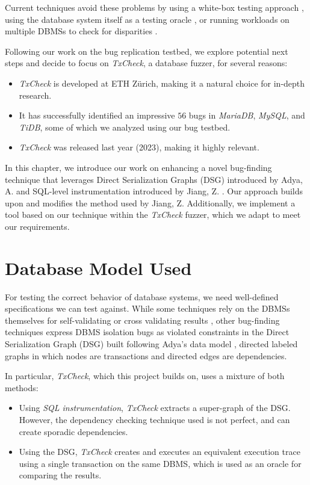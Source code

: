 Current techniques avoid these problems by using a white-box testing approach \cite{clark2024validating}, using the database system itself as a testing oracle \cite{jiang2023detecting}, or running workloads on multiple DBMSs to check for disparities \cite{cui2022differentially_ASE2022}.

Following our work on the bug replication testbed, we explore potential next steps and decide to focus on \textit{TxCheck}, a database fuzzer, for several reasons:

\begin{itemize}
    \item \textit{TxCheck} is developed at ETH Zürich, making it a natural choice for in-depth research.
    \item It has successfully identified an impressive $56$ bugs in \textit{MariaDB}, \textit{MySQL}, and \textit{TiDB}, some of which we analyzed using our bug testbed.
    \item \textit{TxCheck} was released last year (2023), making it highly relevant.
\end{itemize}

In this chapter, we introduce our work on enhancing a novel bug-finding technique that leverages Direct Serialization Graphs (DSG) introduced by Adya, A. \cite{adya1999weak} and SQL-level instrumentation introduced by Jiang, Z. \cite{jiang2023detecting}. Our approach builds upon and modifies the method used by Jiang, Z. Additionally, we implement a tool based on our technique within the \textit{TxCheck} fuzzer, which we adapt to meet our requirements.


\section{Database Model Used}

For testing the correct behavior of database systems, we need well-defined specifications we can test against. While some techniques rely on the DBMSs themselves for self-validating or cross validating results \cite{cui2022differentially_ASE2022}, other bug-finding techniques express DBMS isolation bugs as violated constraints in the Direct Serialization Graph (DSG) built following Adya's data model \cite{jiang2023detecting,clark2024validating}, directed labeled graphs in which nodes are transactions and directed edges are dependencies.

In particular, \textit{TxCheck}, which this project builds on, uses a mixture of both methods:
\begin{itemize}
    \item Using \textit{SQL instrumentation}, \textit{TxCheck} extracts a super-graph of the DSG. However, the dependency checking technique used is not perfect, and can create sporadic dependencies.
    \item Using the DSG, \textit{TxCheck} creates and executes an equivalent execution trace using a single transaction on the same DBMS, which is used as an oracle for comparing the results.
\end{itemize}

